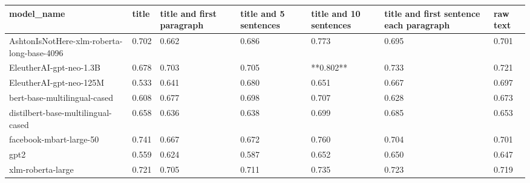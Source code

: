\begin{tabular}{lllllll}
\toprule
                                model\_name & title & title and first paragraph & title and 5 sentences & title and 10 sentences & title and first sentence each paragraph & raw text \\
\midrule
AshtonIsNotHere-xlm-roberta-long-base-4096 & 0.702 &                     0.662 &                 0.686 &                  0.773 &                                   0.695 &    0.701 \\
                   EleutherAI-gpt-neo-1.3B & 0.678 &                     0.703 &                 0.705 &              **0.802** &                                   0.733 &    0.721 \\
                   EleutherAI-gpt-neo-125M & 0.533 &                     0.641 &                 0.680 &                  0.651 &                                   0.667 &    0.697 \\
              bert-base-multilingual-cased & 0.608 &                     0.677 &                 0.698 &                  0.707 &                                   0.628 &    0.673 \\
        distilbert-base-multilingual-cased & 0.658 &                     0.636 &                 0.638 &                  0.699 &                                   0.685 &    0.653 \\
                   facebook-mbart-large-50 & 0.741 &                     0.667 &                 0.672 &                  0.760 &                                   0.704 &    0.701 \\
                                      gpt2 & 0.559 &                     0.624 &                 0.587 &                  0.652 &                                   0.650 &    0.647 \\
                         xlm-roberta-large & 0.721 &                     0.705 &                 0.711 &                  0.735 &                                   0.723 &    0.719 \\
\bottomrule
\end{tabular}
